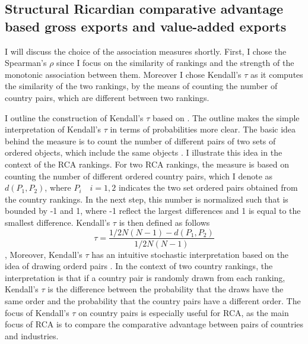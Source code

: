 \subsection{Structural Ricardian comparative advantage based gross exports and value-added exports}
I will discuss the choice of the association measures shortly. First, I chose the Spearman's $\rho$  since I focus on the similarity of rankings and the strength of the monotonic association between them. Moreover I chose Kendall's $\tau$ as it computes the similarity of the two rankings, by the means of counting the number of country pairs, which are different between two rankings.%
\par 
I outline the construction of Kendall's $\tau$ based on \textcite{abdi2007kendall}. The outline makes the simple interpretation of Kendall's $\tau$ in terms of probabilities more clear. The basic idea behind the measure is to count the number of different pairs of two sets of ordered  objects, which include the same objects  \textcite{abdi2007kendall}. I illustrate this idea in the context of the RCA rankings.  For two RCA rankings, the measure is based on counting the number of different ordered country pairs, which I denote as $d(P_1, P_2)$, where $P_i \quad i=1,2$ indicates the two set ordered pairs obtained from the country rankings. In the next step, this number is normalized such that is bounded by -1 and 1, where -1 reflect the largest differences and 1 is equal to the smallest difference.  Kendall's $\tau$ is then defined as follows \[ \tau= \frac{1/2 N(N-1) - d(P_1,P_2)} {1/2 N(N-1)} \], %
Moreover, Kendall's $\tau$ has an intuitive stochastic interpretation based on the idea of drawing orderd pairs \parencite{abdi2007kendall}. In the context of two country rankings, the interpretation is that if a country pair is randomly drawn from each ranking, Kendall's $\tau$ is the difference between the probability that the draws have the same order and the probability that the country pairs have a different order. The focus of Kendall's $\tau$ on country pairs is especially useful  for RCA, as the main focus of RCA is to compare the comparative advantage between pairs of countries and industries.   \par 
